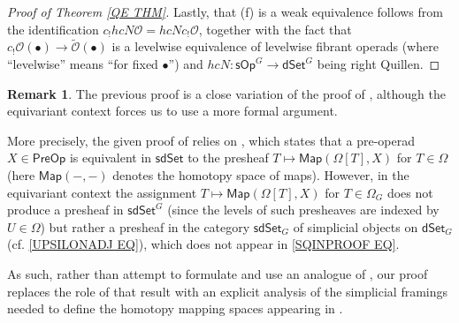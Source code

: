 \documentclass[a4paper,10pt
,draft
]{article}%
\numberwithin{equation}{section}
\numberwithin{figure}{section}
\theoremstyle{definition} %
\newtheorem{remark}[equation]{Remark}%
\newcommand{\sOp}{\ensuremath{\mathsf{sOp}}}%
\newcommand{\dSet}{\mathsf{dSet}}
\renewcommand{\O}{\ensuremath{\mathcal O}}
\newcommand{\1}{\ensuremath{\mathbbm 1}}%
\begin{document}
\begin{proof}[Proof of Theorem \ref{QE THM}]
Lastly, that (f)
is a weak equivalence follows from the identification
$c_! hcN \mathcal{O} = hcN c_! \mathcal{O}$,
together with the fact that
$c_! \mathcal{O}(\bullet) \to \widetilde{\O}(\bullet)$
is a levelwise equivalence of levelwise fibrant operads
(where ``levelwise'' means ``for fixed $\bullet$'')
and $hcN \colon \sOp^G \to \dSet^G$ being right Quillen.
\end{proof}



\begin{remark}
	The previous proof is a close variation of 
	the proof of \cite[Thm. 8.14]{CM13b},
	although the equivariant context 
	forces us to use a more formal argument.
	
	More precisely, the given proof of \cite[Thm. 8.14]{CM13b}
	relies on 
	\cite[Thm 5.9(v)]{CM13b},
	which states that a pre-operad
	$X \in \mathsf{PreOp}$
	is equivalent in $\mathsf{sdSet}$
	to the presheaf
	$T \mapsto \mathsf{Map}(\Omega[T],X)$
	for $T \in \Omega$
	(here $\mathsf{Map}(-,-)$
	denotes the homotopy space of maps).
	However, in the equivariant context
	the assignment 
	$T \mapsto \mathsf{Map}(\Omega[T],X)$
	for $T \in \Omega_G$
	does not produce a presheaf in 
	$\mathsf{sdSet}^G$
	(since the levels of such presheaves are indexed by
	$U \in \Omega$)
	but rather a presheaf in the category
	$\mathsf{sdSet}_G$
	of simplicial objects on $\mathsf{dSet}_G$ (cf. \eqref{UPSILONADJ EQ}),
	which does not appear in 
	\eqref{SQINPROOF EQ}.
	
	As such, rather than attempt to formulate and use
	an analogue of \cite[Thm 5.9(v)]{CM13b},
	our proof replaces the role of that result with 
	an explicit analysis of the simplicial framings
	needed to define the homotopy mapping spaces
	appearing in \cite[Thm 5.9(v)]{CM13b}.
\end{remark}
\end{document}
